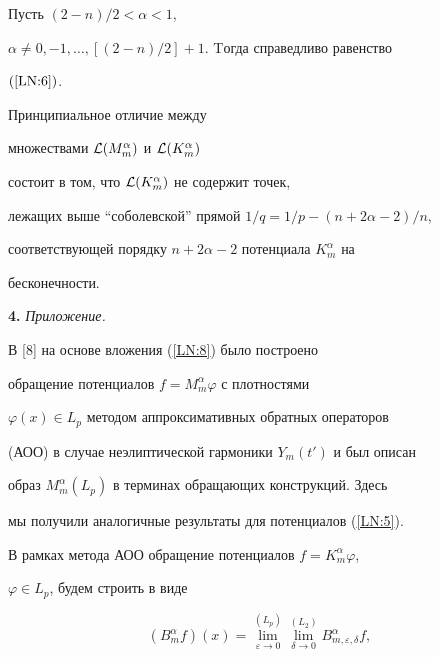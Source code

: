 \begin{thm}


Пусть $(2-n)/2<\alpha<1$,


$\alpha\ne 0,-1,\dotsc,[(2-n)/2]+1$. Tогда справедливо равенство


$(\ref{LN:6})$.


\end{thm}





\begin{notenonum}


Принципиальное отличие между


множествами ${\cal L}(M_m^\alpha)$ и ${\cal L}(K_m^\alpha)$


состоит в том, что ${\cal L}(K_m^\alpha)$ не содержит точек,


лежащих выше ``соболевской'' прямой $1/q=1/p-(n+2\alpha-2)/n$,


соответствующей порядку $n+2\alpha-2$ потенциала $K_m^\alpha$ на


бесконечности.


\end{notenonum}





{\bf 4.} {\it Приложение.}


В [8] на основе вложения (\ref{LN:8}) было построено


обращение потенциалов $f= M_m^\alpha \varphi$ с плотностями


$\varphi(x)\in L_p$ методом аппроксимативных обратных операторов


(АОО) в случае неэлиптической гармоники $Y_m(t')$ и был описан


образ $M_m^\alpha(L_p)$ в терминах обращающих конструкций. Здесь


мы получили аналогичные результаты для потенциалов (\ref{LN:5}).





В рамках метода АОО обращение потенциалов $f=K_m^\alpha \varphi$,


$\varphi\in L_p$, будем строить в виде


\begin{equation}\label{LN:9}


(B_m^\alpha f)(x)= \lim_{\varepsilon\to 0}^{(L_p)} \lim_{\delta\to


0}^{(L_2)} B_{m,\varepsilon,\delta}^\alpha f,


\end{equation}


